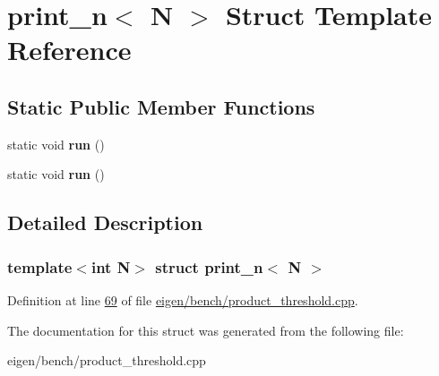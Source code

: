 \hypertarget{structprint__n}{}\section{print\+\_\+n$<$ N $>$ Struct Template Reference}
\label{structprint__n}
\subsection*{Static Public Member Functions}
\begin{DoxyCompactItemize}
\item 
\mbox{\label{structprint__n_a41bc42fbcbd14219f15ccb6afa9c4f62}} 
static void {\bfseries run} ()
\item 
\mbox{\label{structprint__n_a41bc42fbcbd14219f15ccb6afa9c4f62}} 
static void {\bfseries run} ()
\end{DoxyCompactItemize}


\subsection{Detailed Description}
\subsubsection*{template$<$int N$>$\newline
struct print\+\_\+n$<$ N $>$}



Definition at line \hyperlink{eigen_2bench_2product__threshold_8cpp_source_l00069}{69} of file \hyperlink{eigen_2bench_2product__threshold_8cpp_source}{eigen/bench/product\+\_\+threshold.\+cpp}.



The documentation for this struct was generated from the following file\+:\begin{DoxyCompactItemize}
\item 
eigen/bench/product\+\_\+threshold.\+cpp\end{DoxyCompactItemize}
